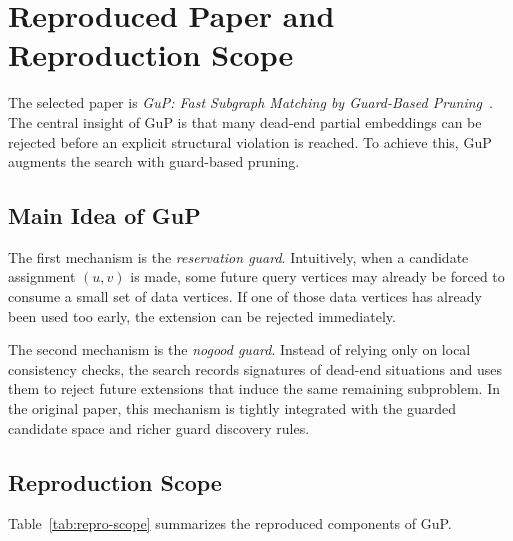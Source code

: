 \section{Reproduced Paper and Reproduction Scope}
\label{sec:paper-idea}

The selected paper is \emph{GuP: Fast Subgraph Matching by Guard-Based Pruning}~\cite{arai2023gup}. The central insight of GuP is that many dead-end partial embeddings can be rejected before an explicit structural violation is reached. To achieve this, GuP augments the search with guard-based pruning.

\subsection{Main Idea of GuP}

The first mechanism is the \emph{reservation guard}. Intuitively, when a candidate assignment $(u,v)$ is made, some future query vertices may already be forced to consume a small set of data vertices. If one of those data vertices has already been used too early, the extension can be rejected immediately.

The second mechanism is the \emph{nogood guard}. Instead of relying only on local consistency checks, the search records signatures of dead-end situations and uses them to reject future extensions that induce the same remaining subproblem. In the original paper, this mechanism is tightly integrated with the guarded candidate space and richer guard discovery rules.

\subsection{Reproduction Scope}

Table~\ref{tab:repro-scope} summarizes the reproduced components of GuP.


